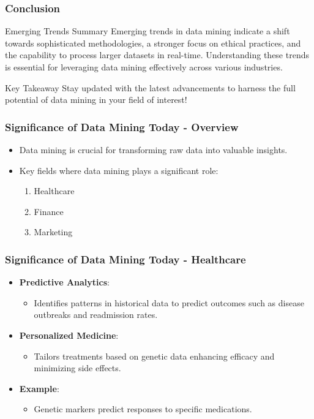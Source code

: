 \documentclass{beamer}
\begin{document}
\begin{frame}[fragile]
    \frametitle{Conclusion}
    \begin{block}{Emerging Trends Summary}
        Emerging trends in data mining indicate a shift towards sophisticated methodologies, a stronger focus on ethical practices, and the capability to process larger datasets in real-time. Understanding these trends is essential for leveraging data mining effectively across various industries.
    \end{block}
    \begin{block}{Key Takeaway}
        Stay updated with the latest advancements to harness the full potential of data mining in your field of interest!
    \end{block}
\end{frame}

\begin{frame}[fragile]
    \frametitle{Significance of Data Mining Today - Overview}
    \begin{itemize}
        \item Data mining is crucial for transforming raw data into valuable insights.
        \item Key fields where data mining plays a significant role:
        \begin{enumerate}
            \item Healthcare
            \item Finance
            \item Marketing
        \end{enumerate}
    \end{itemize}
\end{frame}

\begin{frame}[fragile]
    \frametitle{Significance of Data Mining Today - Healthcare}
    \begin{itemize}
        \item \textbf{Predictive Analytics}: 
        \begin{itemize}
            \item Identifies patterns in historical data to predict outcomes such as disease outbreaks and readmission rates.
        \end{itemize}
        \item \textbf{Personalized Medicine}: 
        \begin{itemize}
            \item Tailors treatments based on genetic data enhancing efficacy and minimizing side effects.
        \end{itemize}
        \item \textbf{Example}:
        \begin{itemize}
            \item Genetic markers predict responses to specific medications.
        \end{itemize}
    \end{itemize}
\end{frame}
\end{document}
